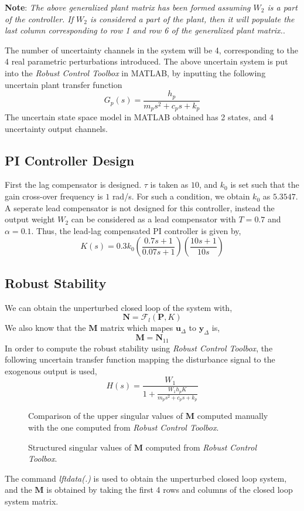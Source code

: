 \textbf{Note}: \textit{The above generalized plant matrix has been formed assuming $W_2$ is a part of the controller. If $W_2$ is considered a part of the plant, then it will populate the last column corresponding to row 1 and row 6 of the generalized plant matrix.}.

The number of uncertainty channels in the system will be 4, corresponding to the 4 real parametric perturbations introduced. The above uncertain system is put into the \emph{Robust Control Toolbox} in MATLAB, by inputting the following uncertain plant transfer function $$G_p(s) = \frac{h_p}{m_ps^2 + c_ps + k_p}$$
The uncertain state space model in MATLAB obtained has 2 states, and 4 uncertainty output channels.

\subsection{PI Controller Design}
First the lag compensator is designed. $\tau$ is taken as $10$, and $k_0$ is set such that the gain cross-over frequency is $1$ rad/s. For such a condition, we obtain $k_0$ as $5.3547$. A seperate lead compensator is not designed for this controller, instead the output weight $W_2$ can be considered as a lead compensator with $T = 0.7$ and $\alpha = 0.1$. Thus, the lead-lag compensated PI controller is given by,
$$K(s) = 0.3k_0\left(\frac{0.7s+1}{0.07s+1}\right)\left(\frac{10s+1}{10s}\right)$$
\subsection{Robust Stability}
We can obtain the unperturbed closed loop of the system with, $$\bm{N} = \mathcal{F}_l(\bm{P},K)$$
We also know that the $\mathbf{M}$ matrix which mapes $\bm{u}_\Delta$ to $\bm{y}_\Delta$ is, $$\bm{M} = \bm{N}_{11}$$
In order to compute the robust stability using \emph{Robust Control Toolbox}, the following uncertain transfer function mapping the disturbance signal to the exogenous output is used,
$$H(s) = \frac{W_1}{1 + \frac{W_1h_pK}{m_ps^2+c_ps+k_p}}$$
\begin{figure}[h!]
    \centering
    \scalebox{0.7}{
    \begin{tikzpicture}
        
    \end{tikzpicture}}
    \caption{Comparison of the upper singular values of $\mathbf{M}$ computed manually with the one computed from \emph{Robust Control Toolbox}.}
    \label{fig:ssv}
\end{figure}
\begin{figure}[h!]
    \centering
    \scalebox{0.7}{
    \begin{tikzpicture}
        
    \end{tikzpicture}}
    \caption{Structured singular values of $\mathbf{M}$ computed from \emph{Robust Control Toolbox}.}
    \label{fig:usv}
\end{figure}
The command \emph{lftdata(.)} is used to obtain the unperturbed closed loop system, and the $\mathbf{M}$ is obtained by taking the first 4 rows and columns of the closed loop system matrix.



